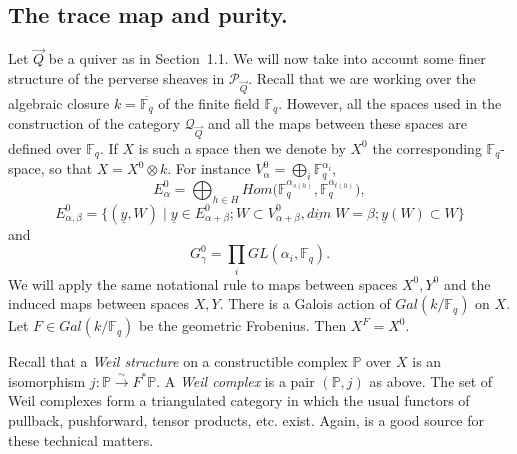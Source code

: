 \documentclass[a4paper,10pt]{amsart}
\def\a{\alpha}
\def\fq{\mathbb{F}_q}
\def\QQ{\mathcal{Q}_{\vec{Q}}}
\numberwithin{equation}{section}
\begin{document}
\vspace{.2in}

\subsection{The trace map and purity.}

\vspace{.15in}

Let $\vec{Q}$ be a quiver as in Section~1.1. We will now take into account some finer structure of the perverse sheaves in $\mathcal{P}_{\vec{Q}}$. Recall that we are working over the algebraic closure $k=\overline{\mathbb{F}_q}$ of the finite field $\mathbb{F}_q$. However, all the spaces used in the construction of the category $\QQ$ and all the maps between these spaces are defined over $\mathbb{F}_q$. If $X$ is such a space then we denote by $X^0$ the corresponding $\mathbb{F}_q$-space, so that $X = X^0 \otimes k$. For instance $V^0_{\a}=\bigoplus_i \fq^{\a_i}$,
$$E^0_{\alpha}=\bigoplus_{h \in H} Hom\big(\fq^{\a_{s(h)}}, \fq^{\a_{t(h)}}\big),$$
$$E^0_{\a,\beta}=\big\{ (\underline{y}, W)\;|\; \underline{y} \in E^0_{\a+\beta}; W \subset V^0_{\a+\beta}, \underline{dim}\;W=\beta; \underline{y}(W) \subset W\big\}$$
and
$$G_{\gamma}^0=\prod_i GL(\a_i, \fq).$$ 
We will apply the same notational rule to maps between spaces $X^0, Y^0$ and the induced maps between spaces $X,Y$. There is a Galois action of $Gal(k/\fq)$ on $X$. Let $F \in Gal(k/\fq)$ be the geometric Frobenius. Then $X^F=X^0$.

\vspace{.1in}

Recall that a \textit{Weil structure} on a constructible complex $\mathbb{P}$ over $X$ is an isomorphism $j: \mathbb{P} \stackrel{\sim}{\to} F^* \mathbb{P}$. A \textit{Weil complex} is a pair $(\mathbb{P},j)$ as above. The set of Weil complexes form a triangulated category in which the usual functors of pullback, pushforward, tensor products, etc. exist. Again, \cite{KW} is a good source for these technical matters.

\vspace{.1in}
\end{document}
